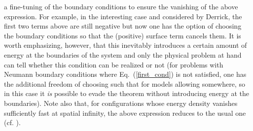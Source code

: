 \documentclass[a4paper,prd,twocolumn,showpacs,amsmath]{revtex4}
\providecommand{\domega}{\partial \Omega}
\providecommand{\E}{{\mathcal E}}
\begin{document}
a fine-tuning of the boundary conditions to ensure the vanishing of the above expression.
For example, in the interesting case \coordHE{} and \coordHE{} considered by Derrick,
the first two terms above are still negative but now one has the option of choosing
the boundary conditions so that the (positive) surface term cancels them.
It is worth emphasizing, however, that this inevitably introduces a certain amount of energy
at the boundaries of the system
and only the physical problem at hand can tell whether this condition can be realized or not
(for problems with Neumann boundary conditions where Eq.~(\ref{first_cond}) is not satisfied, one has the
additional freedom of choosing \myHighlight{$\phi_i|_{\domega}$}\coordHE{} such that
\myHighlight{$[\E_1(\nabla\phi_i)+\E_2(\phi_i)]_{\domega}=0$}\coordHE{} for models allowing \coordHE{} somewhere, so in this
case it {\em is} possible to evade the theorem without introducing energy at the boundaries). Note also that,
for configurations
whose energy density vanishes sufficiently fast at spatial infinity, the above expression reduces to the
usual one (cf. \cite{rajaraman,coleman-book}).
\end{document}
